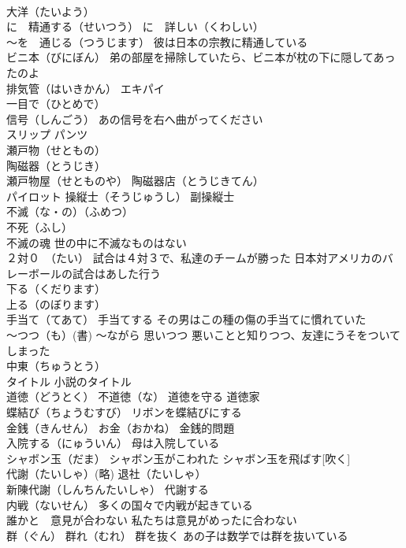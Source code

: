 \documentclass[8pt]{extreport}
\begin{document}
\begin{CJK}{UTF8}{min}
\\	大洋（たいよう）
\\	に　精通する（せいつう） に　詳しい（くわしい）
\\	～を　通じる（つうじます） 彼は日本の宗教に精通している
\\	ビニ本（びにぼん） 弟の部屋を掃除していたら、ビニ本が枕の下に隠してあったのよ
\\	排気管（はいきかん） エキパイ
\\	一目で（ひとめで）
\\	信号（しんごう） あの信号を右へ曲がってください
\\	スリップ パンツ　
\\	瀬戸物（せともの）
\\	陶磁器（とうじき）
\\	瀬戸物屋（せとものや） 陶磁器店（とうじきてん）
\\	パイロット 操縦士（そうじゅうし） 副操縦士
\\	不滅（な・の）（ふめつ）
\\	不死（ふし） 
\\	不滅の魂 世の中に不滅なものはない
\\	２対０　（たい） 試合は４対３で、私達のチームが勝った 日本対アメリカのバレーボールの試合はあした行う
\\	下る（くだります） 
\\	上る（のぼります） 
\\	手当て（てあて） 手当てする その男はこの種の傷の手当てに慣れていた
\\	～つつ（も）(書) ～ながら 思いつつ 悪いことと知りつつ、友達にうそをついてしまった
\\	中東（ちゅうとう）
\\	タイトル 小説のタイトル
\\	道徳（どうとく） 不道徳（な） 道徳を守る 道徳家
\\	蝶結び（ちょうむすび） リボンを蝶結びにする
\\	金銭（きんせん） お金（おかね） 金銭的問題
\\	入院する（にゅういん） 母は入院している
\\	シャボン玉（だま） シャボン玉がこわれた シャボン玉を飛ばす[吹く]
\\	代謝（たいしゃ）(略) 退社（たいしゃ）
\\	新陳代謝（しんちんたいしゃ） 代謝する
\\	内戦（ないせん） 多くの国々で内戦が起きている
\\	誰かと　意見が合わない 私たちは意見がめったに合わない
\\	群（ぐん） 群れ（むれ） 群を抜く あの子は数学では群を抜いている

\end{CJK}
\end{document}
